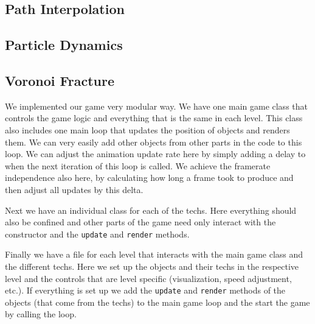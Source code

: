\documentclass{article}
\begin{document}
\subsection{Path Interpolation}

\subsection{Particle Dynamics}

\subsection{Voronoi Fracture}

We implemented our game very modular way. We have one main game class that controls the game logic 
and everything that is the same in each level. This class also includes one main loop that 
updates the position of objects and renders them. We can very easily add other objects from other parts in the 
code to this loop. We can adjust the animation update rate here 
by simply adding a delay to when the next iteration of this loop is called. 
We achieve the framerate independence also here, by calculating how long a frame took to produce 
and then adjust all updates by this delta. 

Next we have an individual class for each of the techs. Here everything should 
also be confined and other parts of the game need only interact with the constructor
and the \texttt{update} and \texttt{render} methods.

Finally we have a file for each level that interacts with the main game 
class and the different techs. Here we set up
the objects and their techs in the respective level and the controls that are level specific (visualization, speed adjustment, etc.).
If everything is set up we add the \texttt{update} and \texttt{render} methods of the objects (that come from the techs) 
to the main game loop and the start the game by calling the loop.
\end{document}
